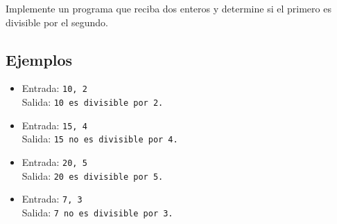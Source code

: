 Implemente un programa que reciba dos enteros y determine si el primero es divisible por el segundo.
\subsection*{Ejemplos}
\begin{itemize}
    \item Entrada: \texttt{10, 2}\\
          Salida: \texttt{10 es divisible por 2.}
    \item Entrada: \texttt{15, 4}\\
          Salida: \texttt{15 no es divisible por 4.}
    \item Entrada: \texttt{20, 5}\\
          Salida: \texttt{20 es divisible por 5.}
    \item Entrada: \texttt{7, 3}\\
          Salida: \texttt{7 no es divisible por 3.}
\end{itemize}
